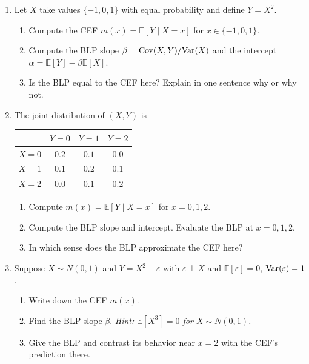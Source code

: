 \documentclass{article}
\newcommand{\E}{\mathbb{E}}
\begin{document}
\begin{enumerate}[label=\textbf{A.\arabic*},leftmargin=*,itemsep=10pt]

\item Let $X$ take values $\{-1, 0, 1\}$ with equal probability and define $Y = X^2$.
\begin{enumerate}[label=(\alph*)]
  \item Compute the CEF $m(x) = \E[Y \mid X = x]$ for $x \in \{-1,0,1\}$.
  \item Compute the BLP slope $\beta = \text{Cov}(X,Y)/\mbox{Var}(X)$ and the intercept $\alpha = \E[Y] - \beta\E[X]$.
  \item Is the BLP equal to the CEF here?  Explain in one sentence why or why not.
\end{enumerate}

\item The joint distribution of $(X,Y)$ is
\begin{center}
\begin{tabular}{c|ccc}
      & $Y=0$ & $Y=1$ & $Y=2$ \\
\hline
$X=0$ & $0.2$ & $0.1$ & $0.0$ \\
$X=1$ & $0.1$ & $0.2$ & $0.1$ \\
$X=2$ & $0.0$ & $0.1$ & $0.2$
\end{tabular}
\end{center}
\begin{enumerate}[label=(\alph*)]
  \item Compute $m(x) = \E[Y \mid X = x]$ for $x = 0, 1, 2$.
  \item Compute the BLP slope and intercept.  Evaluate the BLP at $x = 0, 1, 2$.
  \item In which sense does the BLP approximate the CEF here?
\end{enumerate}

\item Suppose $X \sim N(0,1)$ and $Y = X^2 + \varepsilon$ with $\varepsilon \perp X$ and $\E[\varepsilon] = 0$, $\mbox{Var}(\varepsilon) = 1$.
\begin{enumerate}[label=(\alph*)]
  \item Write down the CEF $m(x)$.
  \item Find the BLP slope $\beta$.  \emph{Hint: $\E[X^3] = 0$ for $X \sim N(0,1)$.}
  \item Give the BLP and contrast its behavior near $x = 2$ with the CEF's prediction there.
\end{enumerate}


\end{enumerate}
\end{document}
